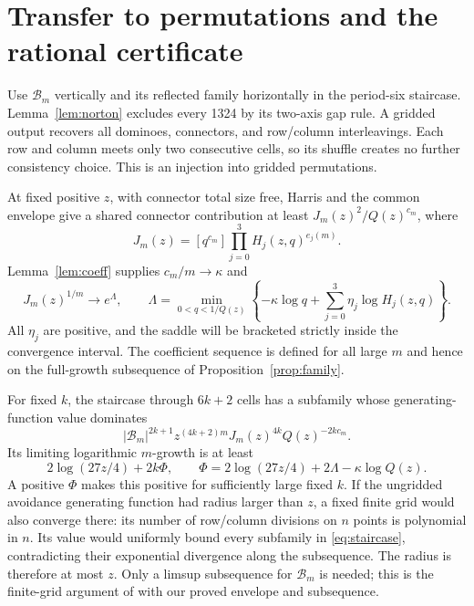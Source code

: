 \documentclass[11pt]{amsart}
\numberwithin{equation}{section}
\theoremstyle{remark}\newtheorem{remark}[theorem]{Remark}
\begin{document}
\section{Transfer to permutations and the rational certificate}
Use $\mathcal B_m$ vertically and its reflected family horizontally in the period-six staircase. Lemma~\ref{lem:norton} excludes every 1324 by its two-axis gap rule. A gridded output recovers all dominoes, connectors, and row/column interleavings. Each row and column meets only two consecutive cells, so its shuffle creates no further consistency choice. This is an injection into gridded permutations.

At fixed positive $z$, with connector total size free, Harris and the common envelope give a shared connector contribution at least $J_m(z)^2/Q(z)^{c_m}$, where
\[
 J_m(z)=[q^{c_m}]\prod_{j=0}^3H_j(z,q)^{e_j(m)}.
\]
Lemma~\ref{lem:coeff} supplies $c_m/m\to\kappa$ and
\begin{equation}\label{eq:Lambda}
 J_m(z)^{1/m}\longrightarrow e^\Lambda,\qquad
 \Lambda=\min_{0<q<1/Q(z)}
       \left\{-\kappa\log q+\sum_{j=0}^3\eta_j\log H_j(z,q)\right\}.
\end{equation}
All $\eta_j$ are positive, and the saddle will be bracketed strictly inside the convergence interval. The coefficient sequence is defined for all large $m$ and hence on the full-growth subsequence of Proposition~\ref{prop:family}.

For fixed $k$, the staircase through $6k+2$ cells has a subfamily whose generating-function value dominates
\begin{equation}\label{eq:staircase}
 |\mathcal B_m|^{2k+1}z^{(4k+2)m}J_m(z)^{4k}Q(z)^{-2kc_m}.
\end{equation}
Its limiting logarithmic $m$-growth is at least
\[
 2\log(27z/4)+2k\Phi,\qquad
 \Phi=2\log(27z/4)+2\Lambda-\kappa\log Q(z).
\]
A positive $\Phi$ makes this positive for sufficiently large fixed $k$. If the ungridded avoidance generating function had radius larger than $z$, a fixed finite grid would also converge there: its number of row/column divisions on $n$ points is polynomial in $n$. Its value would uniformly bound every subfamily in \eqref{eq:staircase}, contradicting their exponential divergence along the subsequence. The radius is therefore at most $z$. Only a limsup subsequence for $\mathcal B_m$ is needed; this is the finite-grid argument of \cite[Proposition 4.5]{N3} with our proved envelope and subsequence.
\end{document}
